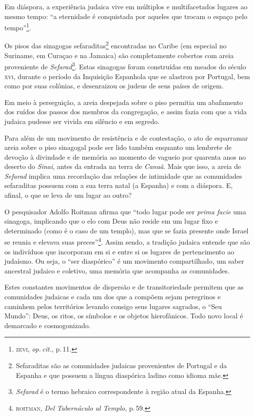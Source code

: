 Em diáspora, a experiência judaica vive em múltiplos e multifacetados
lugares ao mesmo tempo: ``a eternidade é conquistada por aqueles
que trocam o espaço pelo tempo''\footnote{\textsc{zevi}, \emph{op.\,cit.}, p.\,11.}.

\begin{center}\end{center}

\noindent{}Os pisos das sinagogas sefaraditas\footnote{Sefaraditas
  são as comunidades judaicas provenientes de Portugal e da Espanha e
  que possuem a língua diaspórica ladino como idioma mãe.}
encontradas no Caribe (em especial no Suriname, em Curaçao e na Jamaica)
são completamente cobertos com areia proveniente de
\emph{Sefarad}\footnote{\emph{Sefarad} é o termo hebraico correspondente
  à região atual da Espanha.}. Estas sinagogas foram construídas em
meados do século \textsc{xvi}, durante o período da Inquisição Espanhola que se
alastrou por Portugal, bem como por suas colônias, e desenraizou os
judeus de seus países de origem.

Em meio à perseguição, a areia despejada sobre o piso permitia um
abafamento dos ruídos dos passos dos membros da congregação, e assim
fazia com que a vida judaica pudesse ser vivida em silêncio e em
segredo.

Para além de um movimento de resistência e de contestação, o ato de
esparramar areia sobre o piso sinagogal pode ser lido também enquanto um
lembrete de devoção à divindade e de memória ao momento de vagueio por
quarenta anos no deserto do \emph{Sinai}, antes da entrada na terra de
\emph{Canaã}. Mais que isso, a areia de \emph{Sefarad} implica uma
recordação das relações de intimidade que as comunidades
sefaraditas possuem com a sua terra natal (a Espanha) e com a
diáspora. E, afinal, o que se leva de um lugar ao outro?

O pesquisador Adolfo Roitman afirma que ``todo lugar pode ser
\emph{prima facie} uma sinagoga, implicando que o elo com Deus não reside em um
lugar fixo e determinado (como é o caso de um templo), mas que se fazia
presente onde Israel se reunia e elevava suas preces''\footnote{\textsc{roitman},
  \emph{Del Tabernáculo al Templo}, p.\,59.}. Assim sendo, a tradição
judaica entende que são os indivíduos que incorporam em si e entre si os
lugares de pertencimento ao judaísmo. Ou seja, o ``ser diaspórico'' é um
movimento compartilhado, um saber ancestral judaico e coletivo, uma
memória que acompanha as comunidades.

Estes constantes movimentos de dispersão e de transitoriedade permitem
que as comunidades judaicas e cada um dos que a compõem sejam peregrinos
e caminhem pelos territórios levando consigo seus lugares sagrados, o
``Seu Mundo'': Deus, os ritos, os símbolos e os objetos hierofânicos.
Todo novo local é demarcado e cosmogonizado.

